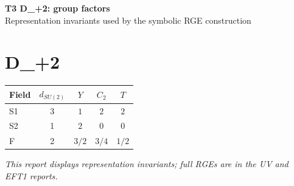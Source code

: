 \documentclass[10pt,a4paper]{article}
\begin{document}
\begin{center}
{\Large\bfseries T3 D\_+2: group factors}\\[4pt]
Representation invariants used by the symbolic RGE construction
\end{center}
\bigskip
\section*{D\_+2}
\begin{longtable}{@{}lcccc@{}}
\toprule Field & $d_{SU(2)}$ & $Y$ & $C_2$ & $T$ \\
\midrule
S1 & 3 & $1$ & $2$ & $2$ \\
S2 & 1 & $2$ & $0$ & $0$ \\
F & 2 & $3/2$ & $3/4$ & $1/2$ \\
\bottomrule
\end{longtable}
\emph{This report displays representation invariants; full RGEs are in the UV and EFT1 reports.}
\end{document}
